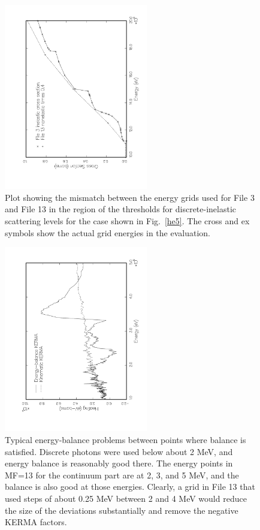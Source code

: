 \begin{figure}[t]\centering
\includegraphics[keepaspectratio,height=3.2in, angle=270]{figs/heatr6ack}
\caption[Example of File 3 and File 13 energy grid mis-match]{Plot
 showing  the mismatch between the energy grids used for File 3
 and File 13 in the region of the thresholds for discrete-inelastic
 scattering levels for the case shown in Fig.~\ref{he5}. The cross
 and ex symbols show the actual grid energies in the evaluation.}
\label{he6}
\end{figure}

\begin{figure}[b]\centering
\includegraphics[keepaspectratio,height=3.2in, angle=-90]{figs/heatr7ack}
\caption[Example of energy-balance problems]{Typical energy-balance
 problems between points where balance is satisfied.  Discrete photons
 were used below about 2 MeV, and energy balance is reasonably good
 there.  The energy points in MF=13 for the continuum part are at 2, 3, and
 5 MeV, and the balance is also good at those energies.  Clearly, a grid
 in File 13 that used steps of about 0.25 MeV between 2 and 4 MeV would
 reduce the size of the deviations substantially and remove the negative
 KERMA factors.}
\label{he7}
\end{figure}

